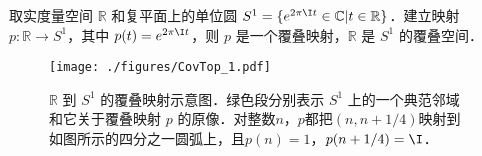 \begin{example}{}
取实度量空间 $\mathbb{R}$ 和复平面上的单位圆 $S^1=\{e^{2\pi\I t}\in\mathbb{C}|t\in\mathbb{R}\}$．建立映射 $p:\mathbb{R}\rightarrow S^1$，其中 $p(t)=e^{2\pi\I t}$，则 $p$ 是一个覆叠映射，$\mathbb{R}$ 是 $S^1$ 的覆叠空间．

\begin{figure}[ht]
\centering
\texttt{[image: ./figures/CovTop\_1.pdf]}
\caption{$\mathbb{R}$ 到 $S^1$ 的覆叠映射示意图．绿色段分别表示 $S^1$ 上的一个典范邻域和它关于覆叠映射 $p$ 的原像．对整数$n$，$p$都把$(n, n+1/4)$映射到如图所示的四分之一圆弧上，且$p(n)=1$，$p(n+1/4)=\I$．} \label{CovTop_fig1}
\end{figure}
\end{example}

